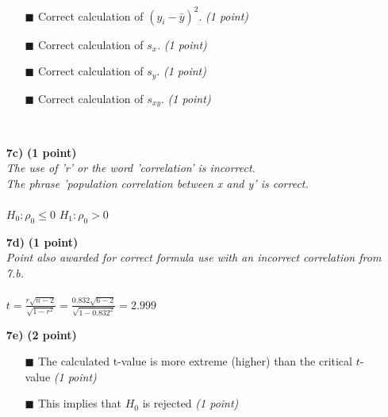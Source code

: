 \begin{itemize}
\begin{itemize}
        \item[$\blacksquare$] Correct calculation of $(y_i - \bar{y})^2$. \textit{(1 point)}
        \item[$\blacksquare$] Correct calculation of $s_x$. \textit{(1 point)}
        \item[$\blacksquare$] Correct calculation of $s_y$. \textit{(1 point)}
        \item[$\blacksquare$] Correct calculation of $s_{xy}$. \textit{(1 point)}
    \end{itemize} \\
\item[\textbf{7c)}] \textbf{(1 point)} \\
\textit{The use of 'r' or the word 'correlation' is incorrect. \\ The phrase 'population correlation between x and y' is correct.} \\ \\ 
$H_0: \rho_0 \leq 0$ \hspace{3cm} $H_1: \rho_0 > 0$ \\
\item[\textbf{7d)}] \textbf{(1 point)} \\
\textit{Point also awarded for correct formula use with an incorrect correlation from 7.b.} \\ \\ 
$t = \frac{r \sqrt{n - 2}}{\sqrt{1 - r^2}} = \frac{0.832 \sqrt{6 - 2}}{\sqrt{1 - 0.832^2}} = 2.999$ \\
\item[\textbf{7e)}] \textbf{(2 point)} \\
        \begin{itemize}
        \item[$\blacksquare$] The calculated t-value is more extreme (higher) than the critical $t$-value \textit{(1 point)}
        \item[$\blacksquare$] This implies that $H_0$ is rejected \textit{(1 point)}
        \end{itemize}
\end{itemize}

\normalfont

\clearpage %